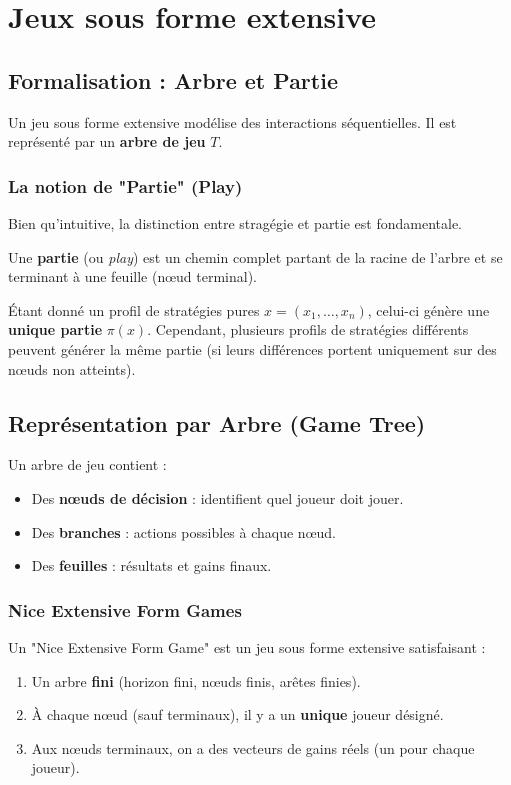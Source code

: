 \chapter{Jeux sous forme extensive}

\section{Formalisation : Arbre et Partie}

Un jeu sous forme extensive modélise des interactions séquentielles. Il est représenté par un \textbf{arbre de jeu} $T$.

\subsection{La notion de "Partie" (Play)}
Bien qu'intuitive, la distinction entre stragégie et partie est fondamentale.
\begin{definition}[Partie]
Une \textbf{partie} (ou \textit{play}) est un chemin complet partant de la racine de l'arbre et se terminant à une feuille (nœud terminal).
\end{definition}

\begin{proposition}
Étant donné un profil de stratégies pures $x = (x_1, \dots, x_n)$, celui-ci génère une \textbf{unique partie} $\pi(x)$.
Cependant, plusieurs profils de stratégies différents peuvent générer la même partie (si leurs différences portent uniquement sur des nœuds non atteints).
\end{proposition}

\section{Représentation par Arbre (Game Tree)}

Un arbre de jeu contient :
\begin{itemize}
    \item Des \textbf{nœuds de décision} : identifient quel joueur doit jouer.
    \item Des \textbf{branches} : actions possibles à chaque nœud.
    \item Des \textbf{feuilles} : résultats et gains finaux.
\end{itemize}

\subsection{Nice Extensive Form Games}
\begin{definition}
Un "Nice Extensive Form Game" est un jeu sous forme extensive satisfaisant :
\begin{enumerate}
    \item Un arbre \textbf{fini} (horizon fini, nœuds finis, arêtes finies).
    \item À chaque nœud (sauf terminaux), il y a un \textbf{unique} joueur désigné.
    \item Aux nœuds terminaux, on a des vecteurs de gains réels (un pour chaque joueur).
\end{enumerate}
\end{definition}

